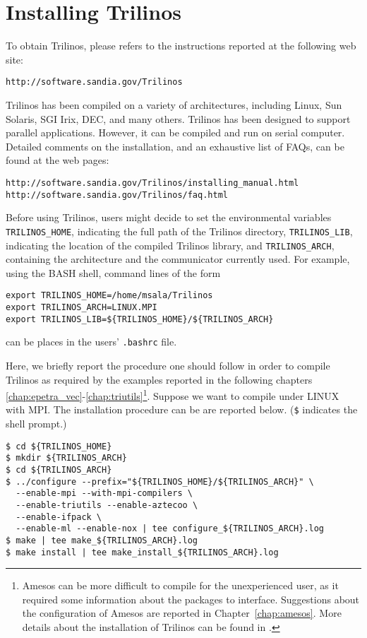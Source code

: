 
\section{Installing Trilinos}
\label{sec:installing}

To obtain Trilinos, please refers to the instructions reported at the
following web site:
\begin{verbatim}
http://software.sandia.gov/Trilinos
\end{verbatim}

Trilinos has been compiled on a variety of architectures, including
Linux, Sun Solaris, SGI Irix, DEC, and many others. Trilinos has been
designed to support parallel applications. However, it can be compiled
and run on serial computer.  Detailed comments on the installation, and
an exhaustive list of FAQs, can be found at the web pages:
\begin{verbatim}
http://software.sandia.gov/Trilinos/installing_manual.html
http://software.sandia.gov/Trilinos/faq.html
\end{verbatim}


Before using Trilinos, users might decide to set the environmental
variables \verb!TRILINOS_HOME!, indicating the full path of the Trilinos
directory, \verb!TRILINOS_LIB!, indicating the location of the compiled
Trilinos library, and \verb!TRILINOS_ARCH!, containing the architecture
and the communicator currently used.  For example, using the BASH shell,
command lines of the form
\begin{verbatim}
export TRILINOS_HOME=/home/msala/Trilinos
export TRILINOS_ARCH=LINUX.MPI
export TRILINOS_LIB=${TRILINOS_HOME}/${TRILINOS_ARCH}
\end{verbatim}
can be places in the users' \verb!.bashrc! file.

\smallskip

Here, we briefly report the procedure one should follow in order to
compile Trilinos as required by the examples reported in the following
chapters \ref{chap:epetra_vec}-\ref{chap:triutils}\footnote{Amesos can
  be more difficult to compile for the unexperienced user, as it
  required some information about the packages to interface. Suggestions
  about the configuration of Amesos are reported in
  Chapter~\ref{chap:amesos}. More details about the installation of
  Trilinos can be found in \cite{Trilinos-Users-Guide}.}.  Suppose we
want to compile under LINUX with MPI. The installation procedure can be
are reported below. (\verb!$! indicates the shell prompt.)
\begin{verbatim}
$ cd ${TRILINOS_HOME}
$ mkdir ${TRILINOS_ARCH}
$ cd ${TRILINOS_ARCH}
$ ../configure --prefix="${TRILINOS_HOME}/${TRILINOS_ARCH}" \
  --enable-mpi --with-mpi-compilers \
  --enable-triutils --enable-aztecoo \
  --enable-ifpack \
  --enable-ml --enable-nox | tee configure_${TRILINOS_ARCH}.log
$ make | tee make_${TRILINOS_ARCH}.log
$ make install | tee make_install_${TRILINOS_ARCH}.log
\end{verbatim}

